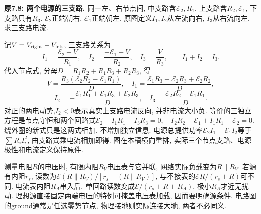 \begin{example}
\textbf{原7.8: 两个电源的三支路.} 同一左、右节点间, 中支路含$\mathcal E_2,R_1$, 上支路含$R_2,\mathcal E_1$, 下支路只有$R_3$. $\mathcal E_2$正端朝右, $\mathcal E_1$正端朝左. 原图定义$I_1,I_2$从左流向右, $I_3$从右流向左. 求三支路电流.
\end{example}
\begin{center}
\end{center}
\begin{solution}
记$V=V_{\rm right}-V_{\rm left}$, 三支路关系为
\[I_1=\frac{\mathcal E_2-V}{R_1},\quad I_2=\frac{-\mathcal E_1-V}{R_2},\quad I_3=\frac V{R_3},\qquad I_1+I_2=I_3.\]
代入节点式, 分母$D=R_1R_2+R_1R_3+R_2R_3$, 得
\[V=\frac{R_3(\mathcal E_2R_2-\mathcal E_1R_1)}D,\quad
I_1=\frac{\mathcal E_1R_3+\mathcal E_2R_3+\mathcal E_2R_2}D,\]
\[I_2=-\frac{\mathcal E_1R_1+\mathcal E_1R_3+\mathcal E_2R_3}D,\quad
I_3=\frac{\mathcal E_2R_2-\mathcal E_1R_1}D.\]
对正的两电动势,$I_2<0$表示真实上支路电流反向, 并非电流大小负. 等价的三独立方程是节点守恒和两个回路式$\mathcal E_2-I_1R_1-I_3R_3=0$, $-I_2R_2-\mathcal E_1+I_1R_1-\mathcal E_2=0$. 绕外圈的新式只是这两式相加, 不增加独立信息. 电源总提供功率$\mathcal E_2I_1-\mathcal E_1I_2$等于$\sum R_iI_i^2$, 由支路式乘电流相加即得. 图在本稿横向重排, 实际三个节点支路、电源极性和电流定义保持原件.
\end{solution}

\label{tb:meters}
测量电阻$R$的电压时, 有限内阻$R_V$电压表与它并联, 网络实际负载变为$R\parallel R_V$. 若源有内阻$r_s$, 读数为$\mathcal E(R\parallel R_V)/[r_s+(R\parallel R_V)]$, 与不接表的$\mathcal ER/(r_s+R)$可不同. 电流表内阻$R_A$串入后, 单回路读数变成$\mathcal E/(r_s+R+R_A)$, 极小$R_A$才近无扰动. 理想源直接固定两端电压的特例可掩盖电压表加载, 因而要明确源条件. 电路图的ground通常是任选零势节点, 物理接地则实际连接大地, 两者不必同义.


